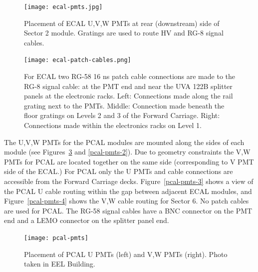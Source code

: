 \documentclass[letterpaper,10pt]{article}
\begin{document}
\begin{figure}[htbp]
  \centering
  \texttt{[image: ecal-pmts.jpg]}
  \vspace{2mm}
  \caption{Placement of ECAL U,V,W PMTs at rear (downstream) side of Sector 2 module.  Gratings are
  used to route HV and RG-8 signal cables.}
\label{ecal-pmts}
\end{figure}


\begin{figure}[htbp]
  \centering
  \texttt{[image: ecal-patch-cables.png]}
  \vspace{2mm}
  \caption{For ECAL two RG-58 16 ns patch cable connections are made to the RG-8 signal cable: at the PMT
    end and near the UVA 122B splitter panels at the electronic racks.  Left: Connections
    made along the rail grating next to the PMTs.  Middle: Connection made beneath the floor gratings on
    Levels 2 and 3 of the Forward Carriage.  Right: Connections made within the electronics racks on Level 1.}
\label{ecal-patch-cables}
\end{figure}

The U,V,W PMTs for the PCAL modules are mounted along the sides of each module
(see Figures~\ref{pcal-pmts} and \ref{pcal-pmts-2}).  Due to geometry constraints the V,W PMTs for PCAL are located
together on the same side (corresponding to V PMT side of the ECAL.)  For PCAL only the U PMTs and cable connections
are accessible from the Forward Carriage decks.  Figure~\ref{pcal-pmts-3} shows a view of the PCAL U cable routing
within the gap between adjacent ECAL modules, and Figure~\ref{pcal-pmts-4} shows the V,W cable routing for Sector 6.
No patch cables are used for PCAL.  The RG-58 signal cables have a BNC connector on the PMT end and a
LEMO connector on the splitter panel end.


\begin{figure}[htbp]
  \centering
  \texttt{[image: pcal-pmts]}
  \vspace{2mm}
  \caption{Placement of PCAL U PMTs (left) and V,W PMTs (right).  Photo taken in EEL Building. }
\label{pcal-pmts}
\end{figure}
\end{document}
